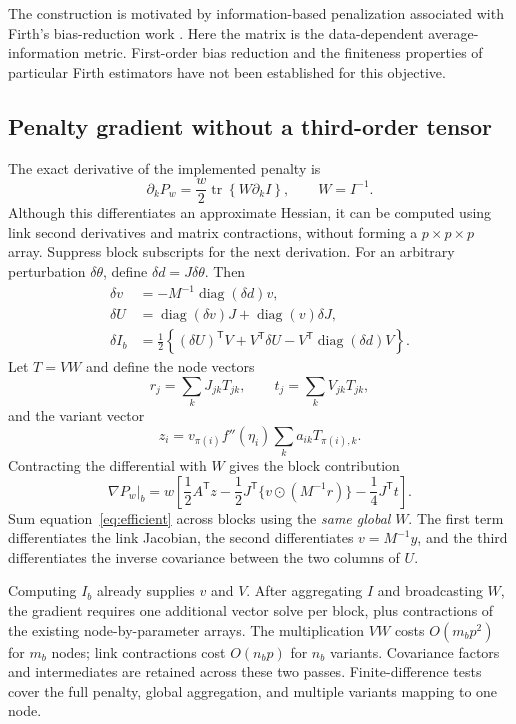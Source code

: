 \documentclass[11pt]{article}
\newcommand{\diag}{\operatorname{diag}}
\newcommand{\tr}{\operatorname{tr}}
\begin{document}
The construction is motivated by information-based penalization associated with Firth's bias-reduction work \cite{firth}. Here the matrix is the data-dependent average-information metric. First-order bias reduction and the finiteness properties of particular Firth estimators have not been established for this objective.

\subsection{Penalty gradient without a third-order tensor}
The exact derivative of the implemented penalty is
\begin{equation}
 \partial_k P_w=\frac{w}{2}\tr\left\{W\partial_k I\right\},\qquad W=I^{-1}.
 \label{eq:trace}
\end{equation}
Although this differentiates an approximate Hessian, it can be computed using link second derivatives and matrix contractions, without forming a $p\times p\times p$ array. Suppress block subscripts for the next derivation. For an arbitrary perturbation $\delta\theta$, define $\delta d=J\delta\theta$. Then
\begin{align}
 \delta v&=-M^{-1}\diag(\delta d)v,\\
 \delta U&=\diag(\delta v)J+\diag(v)\delta J,\\
 \delta I_b&=\frac12\left\{(\delta U)^\mathsf{T}V+V^\mathsf{T}\delta U
       -V^\mathsf{T}\diag(\delta d)V\right\}.
\end{align}
Let $T=VW$ and define the node vectors
\begin{equation}
 r_j=\sum_k J_{jk}T_{jk},\qquad t_j=\sum_k V_{jk}T_{jk},
\end{equation}
and the variant vector
\begin{equation}
 z_i=v_{\pi(i)} f''(\eta_i)\sum_k a_{ik}T_{\pi(i),k}.
\end{equation}
Contracting the differential with $W$ gives the block contribution
\begin{equation}
 \nabla P_w\big|_b=
 w\left[\frac12 A^\mathsf{T}z
 -\frac12J^\mathsf{T}\{v\odot(M^{-1}r)\}
 -\frac14J^\mathsf{T}t\right].
 \label{eq:efficient}
\end{equation}
Sum equation~\eqref{eq:efficient} across blocks using the \emph{same global} $W$. The first term differentiates the link Jacobian, the second differentiates $v=M^{-1}y$, and the third differentiates the inverse covariance between the two columns of $U$.

Computing $I_b$ already supplies $v$ and $V$. After aggregating $I$ and broadcasting $W$, the gradient requires one additional vector solve per block, plus contractions of the existing node-by-parameter arrays. The multiplication $VW$ costs $O(m_b p^2)$ for $m_b$ nodes; link contractions cost $O(n_b p)$ for $n_b$ variants. Covariance factors and intermediates are retained across these two passes. Finite-difference tests cover the full penalty, global aggregation, and multiple variants mapping to one node.
\end{document}
